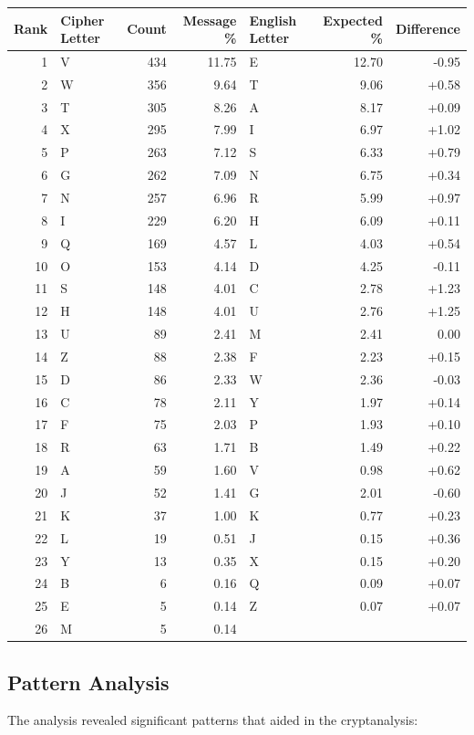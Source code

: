 \documentclass[a4paper,12pt]{article}
\begin{document}
\begin{table}[htbp]
\label{tab:orgf459500}
\centering
\begin{tabular}{rlrrlrr}
Rank & Cipher Letter & Count & Message \% & English Letter & Expected \% & Difference\\
\hline
1 & V & 434 & 11.75 & E & 12.70 & -0.95\\
2 & W & 356 & 9.64 & T & 9.06 & +0.58\\
3 & T & 305 & 8.26 & A & 8.17 & +0.09\\
4 & X & 295 & 7.99 & I & 6.97 & +1.02\\
5 & P & 263 & 7.12 & S & 6.33 & +0.79\\
6 & G & 262 & 7.09 & N & 6.75 & +0.34\\
7 & N & 257 & 6.96 & R & 5.99 & +0.97\\
8 & I & 229 & 6.20 & H & 6.09 & +0.11\\
9 & Q & 169 & 4.57 & L & 4.03 & +0.54\\
10 & O & 153 & 4.14 & D & 4.25 & -0.11\\
11 & S & 148 & 4.01 & C & 2.78 & +1.23\\
12 & H & 148 & 4.01 & U & 2.76 & +1.25\\
13 & U & 89 & 2.41 & M & 2.41 & 0.00\\
14 & Z & 88 & 2.38 & F & 2.23 & +0.15\\
15 & D & 86 & 2.33 & W & 2.36 & -0.03\\
16 & C & 78 & 2.11 & Y & 1.97 & +0.14\\
17 & F & 75 & 2.03 & P & 1.93 & +0.10\\
18 & R & 63 & 1.71 & B & 1.49 & +0.22\\
19 & A & 59 & 1.60 & V & 0.98 & +0.62\\
20 & J & 52 & 1.41 & G & 2.01 & -0.60\\
21 & K & 37 & 1.00 & K & 0.77 & +0.23\\
22 & L & 19 & 0.51 & J & 0.15 & +0.36\\
23 & Y & 13 & 0.35 & X & 0.15 & +0.20\\
24 & B & 6 & 0.16 & Q & 0.09 & +0.07\\
25 & E & 5 & 0.14 & Z & 0.07 & +0.07\\
26 & M & 5 & 0.14 &  &  & \\
\end{tabular}
\end{table}
\subsection{Pattern Analysis}
\label{sec:orgae0f17f}
The analysis revealed significant patterns that aided in the cryptanalysis:
\end{document}

